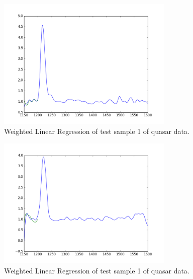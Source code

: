 \documentclass[11pt]{article}
\begin{document}
\begin{figure}
	\centering
	\includegraphics[width=0.75\textwidth]{../p5c3-1.png}
	\caption{ Weighted Linear Regression of test sample 1 of quasar data. }
	\label{fig:5c3-1}
\end{figure}

\begin{figure}
	\centering
	\includegraphics[width=0.75\textwidth]{../p5c3-6.png}
	\caption{ Weighted Linear Regression of test sample 1 of quasar data. }
	\label{fig:5c3-6}
\end{figure}



\end{document}
